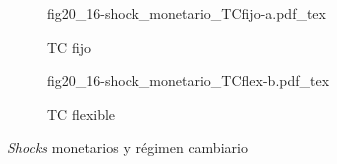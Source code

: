 \begin{figure}[h]
\captionsetup[subfigure]{aboveskip=20pt,belowskip=15pt}
\centering
\begin{subfigure}{.45\textwidth}
  \centering
        \def\svgwidth{\textwidth}
        {fig20_16-shock_monetario_TCfijo-a.pdf_tex}
  \caption{TC fijo}
  \label{fig20_16-shock_monetario_TCfijo-a}
\end{subfigure}\hspace{.05\textwidth}
\begin{subfigure}{.45\textwidth}
  \centering
        \def\svgwidth{\textwidth}
        {fig20_16-shock_monetario_TCflex-b.pdf_tex}
  \caption{TC flexible}
  \label{fig20_16-shock_monetario_TCflex-b}
\end{subfigure}
\caption{\textit{Shocks} monetarios y régimen cambiario}
\label{fig20_16-shock_monetarios}
\end{figure}